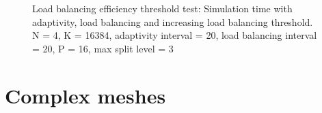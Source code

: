 \begin{figure}[H]
	\centering
	
	\caption{Load balancing efficiency threshold test: Simulation time with adaptivity, load balancing and increasing load balancing threshold. N = 4, K = 16384, adaptivity interval = 20, load balancing interval = 20, P = 16, max split level = 3}
	\label{fig:load_balancing_efficiency_threshold_s5}
\end{figure}

\section{Complex meshes} \label{section:results:complex_meshes}
